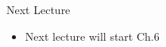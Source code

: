 \documentclass[aspectratio=1610]{beamer}
\begin{document}

%			
%			

\begin{frame}[wide]{Next Lecture}
	\begin{itemize}
		\item Next lecture will start Ch.6
	\end{itemize}
\end{frame}
\end{document}
